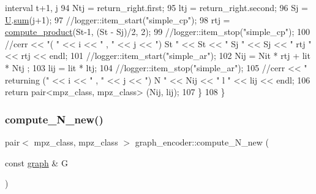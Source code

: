 \begin{DoxyCode}
{       interval t+1, j}
94     Ntj = return\_right.first;
95     ltj = return\_right.second;
96     Sj = \hyperlink{classgraph__encoder_a3314c40920f2ee132958a6b0ce7e7995}{U}.\hyperlink{classreverse__fenwick__tree_a672731fd6395b4853430073a099a80e6}{sum}(j+1);
97     \textcolor{comment}{//logger::item\_start("simple\_cp"); }
98     rtj = \hyperlink{compression__helper_8cpp_ae2afb43aabe50f7d42aae8f82b5a35f4}{compute\_product}(St-1, (St - Sj)/2, 2);
99     \textcolor{comment}{//logger::item\_stop("simple\_cp");}
100     \textcolor{comment}{//cerr << "( " << i << " , " << j << ") St " << St << " Sj " << Sj << " rtj " << rtj << endl;}
101     \textcolor{comment}{//logger::item\_start("simple\_ar");}
102     Nij = Nit * rtj + lit * Ntj ;
103     lij = lit * ltj;
104     \textcolor{comment}{//logger::item\_stop("simple\_ar");}
105     \textcolor{comment}{//cerr << " returning (" << i << " , " << j << ") N " << Nij << " l " << lij << endl;}
106     \textcolor{keywordflow}{return} pair<mpz\_class, mpz\_class> (Nij, lij);
107   \}
108 \}
\end{DoxyCode}
\mbox{\label{classgraph__encoder_aeab221523400ec73da6146fdbbd11274}} 
\subsubsection{\texorpdfstring{compute\+\_\+\+N\+\_\+new()}{compute\_N\_new()}}
{\footnotesize\ttfamily pair$<$ mpz\+\_\+class, mpz\+\_\+class $>$ graph\+\_\+encoder\+::compute\+\_\+\+N\+\_\+new (\begin{DoxyParamCaption}\item[{const \hyperlink{classgraph}{graph} \&}]{G }\end{DoxyParamCaption})}


